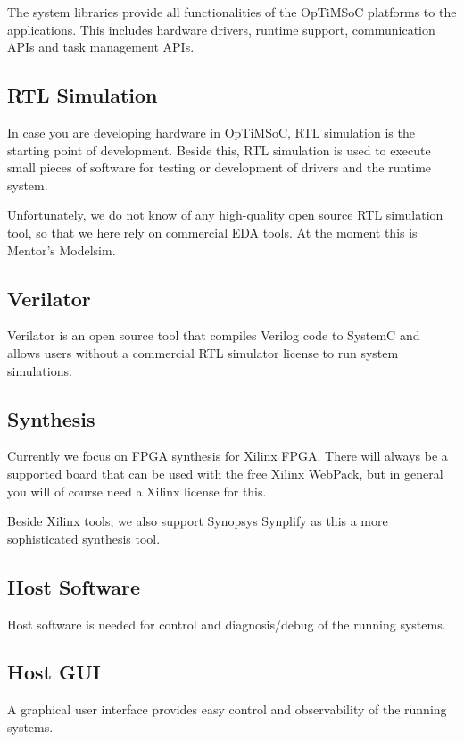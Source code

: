 The system libraries provide all functionalities of the OpTiMSoC
platforms to the applications. This includes hardware drivers, runtime
support, communication APIs and task management APIs.

\subsection*{RTL Simulation}

In case you are developing hardware in OpTiMSoC, RTL simulation is the
starting point of development. Beside this, RTL simulation is used to
execute small pieces of software for testing or development of drivers
and the runtime system.

Unfortunately, we do not know of any high-quality open source RTL
simulation tool, so that we here rely on commercial EDA tools. At the
moment this is Mentor's Modelsim.

\subsection*{Verilator}

Verilator is an open source tool that compiles Verilog code to SystemC
and allows users without a commercial RTL simulator license to run
system simulations.

\subsection*{Synthesis}

Currently we focus on FPGA synthesis for Xilinx FPGA. There will
always be a supported board that can be used with the free Xilinx
WebPack, but in general you will of course need a Xilinx license for
this.

Beside Xilinx tools, we also support Synopsys Synplify as this a more
sophisticated synthesis tool.

\subsection*{Host Software}

Host software is needed for control and diagnosis/debug of the running
systems.

\subsection*{Host GUI}

A graphical user interface provides easy control and observability of
the running systems.